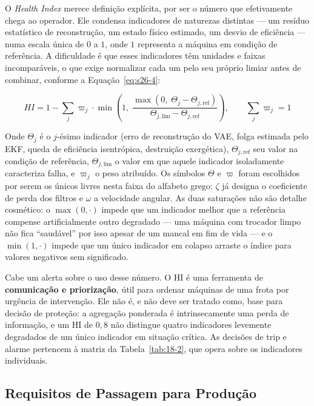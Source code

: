 \documentclass[12pt,a4paper]{article}
\numberwithin{equation}{section}
\numberwithin{table}{section}
\numberwithin{figure}{section}
\begin{document}
	O \textit{Health Index} merece definição explícita, por ser o número que efetivamente chega ao operador. Ele condensa indicadores de naturezas distintas — um resíduo estatístico de reconstrução, um estado físico estimado, um desvio de eficiência — numa escala única de $0$ a $1$, onde $1$ representa a máquina em condição de referência. A dificuldade é que esses indicadores têm unidades e faixas incomparáveis, o que exige normalizar cada um pelo seu próprio limiar antes de combinar, conforme a Equação~\eqref{eq:s26-4}:

	\begin{equation}\label{eq:s26-4}
	HI = 1 - \sum_{j} \varpi_j \cdot \min\left( 1,\; \frac{\max(0,\; \Theta_j - \Theta_{j,\text{ref}})}{\Theta_{j,\text{lim}} - \Theta_{j,\text{ref}}} \right), \qquad \sum_j \varpi_j = 1
\end{equation}

	Onde $\Theta_j$ é o $j$-ésimo indicador (erro de reconstrução do VAE, folga estimada pelo EKF, queda de eficiência isentrópica, destruição exergética), $\Theta_{j,\text{ref}}$ seu valor na condição de referência, $\Theta_{j,\text{lim}}$ o valor em que aquele indicador isoladamente caracteriza falha, e $\varpi_j$ o peso atribuído. Os símbolos $\Theta$ e $\varpi$ foram escolhidos por serem os únicos livres nesta faixa do alfabeto grego: $\zeta$ já designa o coeficiente de perda dos filtros e $\omega$ a velocidade angular. As duas saturações não são detalhe cosmético: o $\max(0,\cdot)$ impede que um indicador melhor que a referência compense artificialmente outro degradado — uma máquina com trocador limpo não fica ``saudável'' por isso apesar de um mancal em fim de vida — e o $\min(1,\cdot)$ impede que um único indicador em colapso arraste o índice para valores negativos sem significado.

	Cabe um alerta sobre o uso desse número. O HI é uma ferramenta de \textbf{comunicação e priorização}, útil para ordenar máquinas de uma frota por urgência de intervenção. Ele não é, e não deve ser tratado como, base para decisão de proteção: a agregação ponderada é intrinsecamente uma perda de informação, e um HI de $0{,}8$ não distingue quatro indicadores levemente degradados de um único indicador em situação crítica. As decisões de trip e alarme pertencem à matriz da Tabela~\ref{tab:18-2}, que opera sobre os indicadores individuais.

	\subsection{Requisitos de Passagem para Produção}
\end{document}
